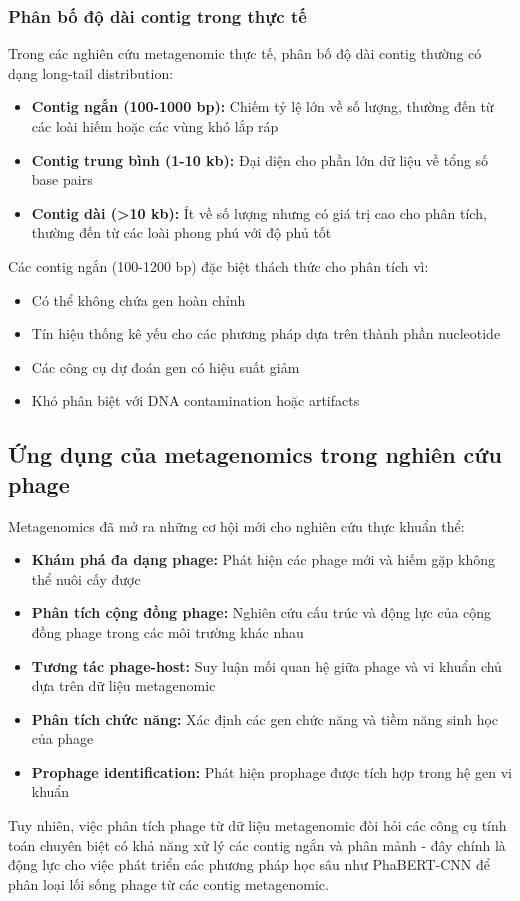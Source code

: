 \subsubsection{Phân bố độ dài contig trong thực tế}

Trong các nghiên cứu metagenomic thực tế, phân bố độ dài contig thường có dạng long-tail distribution:

\begin{itemize}
    \item \textbf{Contig ngắn (100-1000 bp):} Chiếm tỷ lệ lớn về số lượng, thường đến từ các loài hiếm hoặc các vùng khó lắp ráp

    \item \textbf{Contig trung bình (1-10 kb):} Đại diện cho phần lớn dữ liệu về tổng số base pairs

    \item \textbf{Contig dài (>10 kb):} Ít về số lượng nhưng có giá trị cao cho phân tích, thường đến từ các loài phong phú với độ phủ tốt
\end{itemize}

Các contig ngắn (100-1200 bp) đặc biệt thách thức cho phân tích vì:
\begin{itemize}
    \item Có thể không chứa gen hoàn chỉnh
    \item Tín hiệu thống kê yếu cho các phương pháp dựa trên thành phần nucleotide
    \item Các công cụ dự đoán gen có hiệu suất giảm
    \item Khó phân biệt với DNA contamination hoặc artifacts
\end{itemize}

\subsection{Ứng dụng của metagenomics trong nghiên cứu phage}

Metagenomics đã mở ra những cơ hội mới cho nghiên cứu thực khuẩn thể:

\begin{itemize}
    \item \textbf{Khám phá đa dạng phage:} Phát hiện các phage mới và hiếm gặp không thể nuôi cấy được \cite{hayes2017metagenomic}

    \item \textbf{Phân tích cộng đồng phage:} Nghiên cứu cấu trúc và động lực của cộng đồng phage trong các môi trường khác nhau

    \item \textbf{Tương tác phage-host:} Suy luận mối quan hệ giữa phage và vi khuẩn chủ dựa trên dữ liệu metagenomic

    \item \textbf{Phân tích chức năng:} Xác định các gen chức năng và tiềm năng sinh học của phage

    \item \textbf{Prophage identification:} Phát hiện prophage được tích hợp trong hệ gen vi khuẩn
\end{itemize}

Tuy nhiên, việc phân tích phage từ dữ liệu metagenomic đòi hỏi các công cụ tính toán chuyên biệt có khả năng xử lý các contig ngắn và phân mảnh - đây chính là động lực cho việc phát triển các phương pháp học sâu như PhaBERT-CNN để phân loại lối sống phage từ các contig metagenomic.
